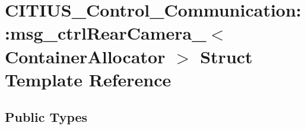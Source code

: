 \hypertarget{struct_c_i_t_i_u_s___control___communication_1_1msg__ctrl_rear_camera__}{\section{\-C\-I\-T\-I\-U\-S\-\_\-\-Control\-\_\-\-Communication\-:\-:msg\-\_\-ctrl\-Rear\-Camera\-\_\-$<$ \-Container\-Allocator $>$ \-Struct \-Template \-Reference}
\label{struct_c_i_t_i_u_s___control___communication_1_1msg__ctrl_rear_camera__}
}
\subsection*{\-Public \-Types}
